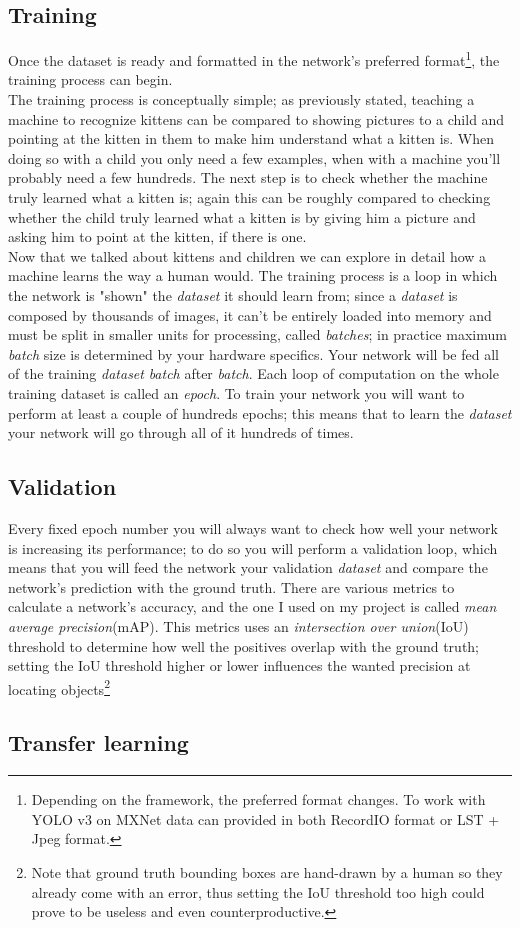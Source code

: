 	\subsection{Training}
	Once the dataset is ready and formatted in the network's preferred format\footnote{Depending on the framework, the preferred format changes. To work with YOLO v3 on MXNet data can provided in both RecordIO format or LST + Jpeg format.}, the training process can begin. \\
	The training process is conceptually simple; as previously stated, teaching a machine to recognize kittens can be compared to showing pictures to a child and pointing at the kitten in them to make him understand what a kitten is. When doing so with a child you only need a few examples, when with a machine you'll probably need a few hundreds. The next step is to check whether the machine truly learned what a kitten is; again this can be roughly compared to checking whether the child truly learned what a kitten is by giving him a picture and asking him to point at the kitten, if there is one. \\
	Now that we talked about kittens and children we can explore in detail how a machine learns the way a human would.
	The training process is a loop in which the network is "shown" the \emph{dataset} it should learn from; since a \emph{dataset} is composed by thousands of images, it can't be entirely loaded into memory and must be split in smaller units for processing, called \emph{batches}; in practice maximum \emph{batch} size is determined by your hardware specifics. Your network will be fed all of the training \emph{dataset} \emph{batch} after \emph{batch}. Each loop of computation on the whole training dataset is called an \emph{\gls{epoch}}\glsfirstoccur. To train your network you will want to perform at least a couple of hundreds epochs; this means that to learn the \emph{dataset} your network will go through all of it hundreds of times. 

	\subsection{Validation}	
	Every fixed epoch number you will always want to check how well your network is increasing its performance; to do so you will perform a validation loop, which means that you will feed the network your validation \emph{dataset} and compare the network's prediction with the ground truth. There are various metrics to calculate a network's accuracy, and the one I used on my project is called \emph{\gls{mean average precision}}\glsfirstoccur (mAP). This metrics uses an \emph{\gls{intersection over union}}\glsfirstoccur (IoU) threshold to determine how well the positives overlap with the ground truth; setting the IoU threshold higher or lower influences the wanted precision at locating objects\footnote{Note that ground truth bounding boxes are hand-drawn by a human so they already come with an error, thus setting the IoU threshold too high could prove to be useless and even counterproductive.}
	\subsection{Transfer learning}